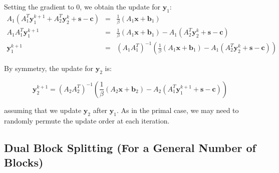 \documentclass{article}
\begin{document}
Setting the gradient to 0, we obtain the update for $\mathbf{y}_{1}$:
\begin{eqnarray*}
A_{1}\left(A_{1}^{T}\mathbf{y}_{1}^{k+1}+A_{2}^{T}\mathbf{y}_{2}^{k}+\mathbf{s}-\mathbf{c}\right) & = & \frac{1}{\beta}\left(A_{1}\mathbf{x}+\mathbf{b}_{1}\right)\\
A_{1}A_{1}^{T}\mathbf{y}_{1}^{k+1} & = & \frac{1}{\beta}\left(A_{1}\mathbf{x}+\mathbf{b}_{1}\right)-A_{1}\left(A_{2}^{T}\mathbf{y}_{2}^{k}+\mathbf{s}-\mathbf{c}\right)\\
\mathbf{y}_{1}^{k+1} & = & \left(A_{1}A_{1}^{T}\right)^{-1}\left(\frac{1}{\beta}\left(A_{1}\mathbf{x}+\mathbf{b}_{1}\right)-A_{1}\left(A_{2}^{T}\mathbf{y}_{2}^{k}+\mathbf{s}-\mathbf{c}\right)\right)
\end{eqnarray*}


By symmetry, the update for $\mathbf{y}_{2}$ is:

\[
\mathbf{y}_{2}^{k+1}=\left(A_{2}A_{2}^{T}\right)^{-1}\left(\frac{1}{\beta}\left(A_{2}\mathbf{x}+\mathbf{b}_{2}\right)-A_{2}\left(A_{1}^{T}\mathbf{y}_{1}^{k+1}+\mathbf{s}-\mathbf{c}\right)\right)
\]


assuming that we update $\mathbf{y}_{2}$ after $\mathbf{y}_{1}$. As in the primal case, we may need to randomly permute the update order at each iteration.
\vspace{0.1in}
\subsection*{Dual Block Splitting (For a General Number of Blocks)}
\end{document}
